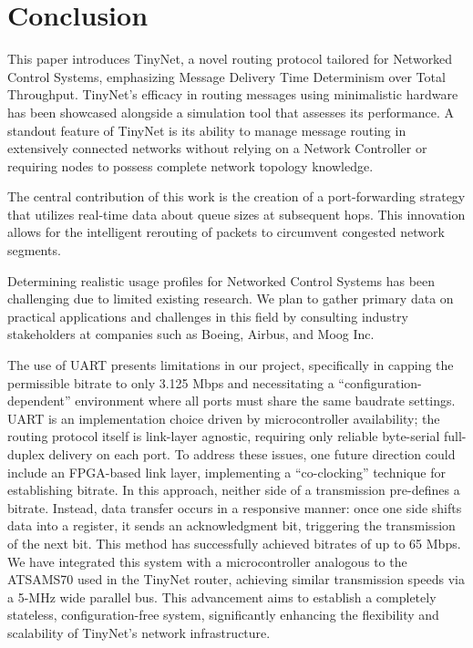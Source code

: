 \section{Conclusion}
This paper introduces TinyNet, a novel routing protocol tailored for Networked Control Systems, emphasizing Message Delivery Time Determinism over Total Throughput. TinyNet's efficacy in routing messages using minimalistic hardware has been showcased alongside a simulation tool that assesses its performance. A standout feature of TinyNet is its ability to manage message routing in extensively connected networks without relying on a Network Controller or requiring nodes to possess complete network topology knowledge.

The central contribution of this work is the creation of a port-forwarding strategy that utilizes real-time data about queue sizes at subsequent hops. This innovation allows for the intelligent rerouting of packets to circumvent congested network segments.

Determining realistic usage profiles for Networked Control Systems has been challenging due to limited existing research. We plan to gather primary data on practical applications and challenges in this field by consulting industry stakeholders at companies such as Boeing, Airbus, and Moog Inc.

The use of UART presents limitations in our project, specifically in capping the permissible bitrate to only 3.125 Mbps and necessitating a ``configuration-dependent'' environment where all ports must share the same baudrate settings. UART is an implementation choice driven by microcontroller availability; the routing protocol itself is link-layer agnostic, requiring only reliable byte-serial full-duplex delivery on each port. To address these issues, one future direction could include an FPGA-based link layer, implementing a ``co-clocking'' technique for establishing bitrate. In this approach, neither side of a transmission pre-defines a bitrate. Instead, data transfer occurs in a responsive manner: once one side shifts data into a register, it sends an acknowledgment bit, triggering the transmission of the next bit. This method has successfully achieved bitrates of up to 65 Mbps. We have integrated this system with a microcontroller analogous to the ATSAMS70 used in the TinyNet router, achieving similar transmission speeds via a 5-MHz wide parallel bus. This advancement aims to establish a completely stateless, configuration-free system, significantly enhancing the flexibility and scalability of TinyNet's network infrastructure.

